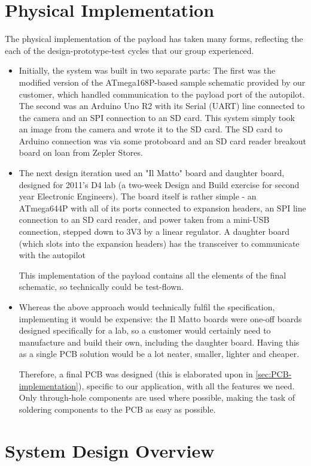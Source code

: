 \section{Physical Implementation}

The physical implementation of the payload has taken many forms, reflecting 
the each of the design-prototype-test cycles that our group experienced.

\begin{itemize}
\item Initially, the system was built in two separate parts: The first was 
the modified version of the ATmega168P-based sample schematic provided by 
our customer, which handled communication to the payload port of the 
autopilot. The second was an Arduino Uno R2 with its Serial (UART) line 
connected to the camera and an SPI connection to an SD card. This system 
simply took an image from the camera and wrote it to the SD card. The SD card 
to Arduino connection was via some protoboard and an SD card reader breakout 
board on loan from Zepler Stores.
\item The next design iteration used an "Il Matto" board and daughter board, 
designed for 2011's D4 lab (a two-week Design and Build exercise for second 
year Electronic Engineers). The board itself is rather simple - an ATmega644P 
with all of its ports connected to expansion headers, an SPI line connection 
to an SD card reader, and power taken from a mini-USB connection, stepped 
down to 3V3 by a linear regulator. A daughter board (which slots into the 
expansion headers) has the transceiver to communicate with the autopilot

This implementation of the payload contains all the elements of the final 
schematic, so technically could be test-flown.
\item Whereas the above approach would technically fulfil the specification, 
implementing it would be expensive: the Il Matto boards were one-off boards 
designed specifically for a lab, so a customer would certainly need to 
manufacture and build their own, including the daughter board. Having this as 
a single PCB solution would be a lot neater, smaller, lighter and cheaper.

Therefore, a final PCB was designed (this is elaborated upon in 
\ref{sec:PCB-implementation}), specific to our application, with all the 
features we need. Only through-hole components are used where possible, 
making the task of soldering components to the PCB as easy as possible.
\end{itemize}

\section{System Design Overview}

